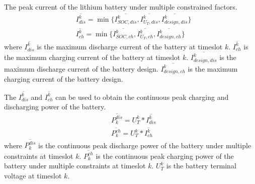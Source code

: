 \documentclass[journal,twoside]{IEEEtran}
\begin{document}
The peak current of the lithium battery under multiple constrained factors.
\begin{align}
&\overline{I^{k}_{dis}}=\min \{ \overline{I^{k}_{SOC,dis}},\overline{I^{k}_{{U_T},dis}},\overline{I^{k}_{{design},dis}}\}\\
&\overline{I^{k}_{ch}}=\min \{ \overline{I^{k}_{SOC,ch}},\overline{I^{k}_{{U_T},ch}},\overline{I^{k}_{{design},ch}}\}
\end{align}
where $\overline{I^{k}_{dis}}$ is the maximum discharge current of the battery at timeslot $k$.
$\overline{I^{k}_{ch}}$ is the maximum charging current of the battery at timeslot $k$.
$\overline{I^{k}_{{design},dis}}$ is the maximum discharge current of the battery design.
$\overline{I^{k}_{{design},ch}}$ is the maximum charging current of the battery design.

The $\overline{I^{k}_{dis}}$ and $\overline{I^{k}_{ch}}$ can be used to obtain the continuous peak charging and discharging power of the battery.
\begin{align}
&\overline{P_{k}^{dis}}={U_T^k}* \overline{I^{k}_{dis}}\\
&\overline{P_{k}^{ch}}={U_T^k}* \overline{I^{k}_{ch}}
\end{align}
where $\overline{P_{k}^{dis}}$ is the continuous peak discharge power of the battery under multiple constraints at timeslot $k$.
$\overline{P_{k}^{ch}}$ is the continuous peak charging power of the battery under multiple constraints at timeslot $k$.
${U_T^k}$ is the battery terminal voltage at timeslot $k$.


\ifCLASSOPTIONcaptionsoff
  \newpage
\fi



\end{document}

